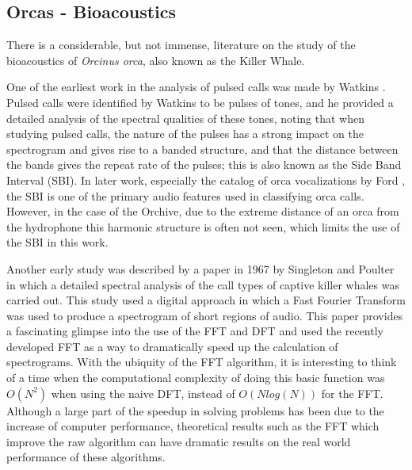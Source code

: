 \subsection{Orcas - Bioacoustics}
\label{sec:relatedWork:orcasBioacoustics}

There is a considerable, but not immense, literature on the study of
the bioacoustics of \textit{Orcinus orca}, also known as the Killer
Whale.  

One of the earliest work in the analysis of pulsed calls was made by
Watkins \cite{watkins1967harmonic}. Pulsed calls were identified by
Watkins to be pulses of tones, and he provided a detailed analysis of
the spectral qualities of these tones, noting that when studying
pulsed calls, the nature of the pulses has a strong impact on the
spectrogram and gives rise to a banded structure, and that the
distance between the bands gives the repeat rate of the pulses; this
is also known as the Side Band Interval (SBI).  In later work,
especially the catalog of orca vocalizations by Ford
\cite{ford1987catalogue}, the SBI is one of the primary audio features
used in classifying orca calls.  However, in the case of the Orchive,
due to the extreme distance of an orca from the hydrophone this
harmonic structure is often not seen, which limits the use of the SBI
in this work.

Another early study was described by a paper in 1967 by Singleton and
Poulter \cite{singleton1967spectral} in which a detailed spectral
analysis of the call types of captive killer whales was carried out.
This study used a digital approach in which a Fast Fourier Transform
was used to produce a spectrogram of short regions of audio.  This
paper provides a fascinating glimpse into the use of the FFT and DFT
and used the recently developed FFT \cite{cooley1965algorithm} as a
way to dramatically speed up the calculation of spectrograms.  With
the ubiquity of the FFT algorithm, it is interesting to think of a
time when the computational complexity of doing this basic function
was $O(N^2)$ when using the naive DFT, instead of $O(N log(N))$ for
the FFT.  Although a large part of the speedup in solving problems has
been due to the increase of computer performance, theoretical results
such as the FFT which improve the raw algorithm can have dramatic
results on the real world performance of these algorithms.



